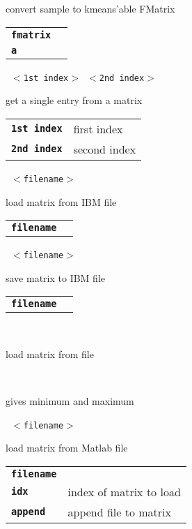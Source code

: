 \begin{description}
\begin{description}
        convert sample to kmeans'able FMatrix

      \begin{tabular}{ll}
 \texttt{\textbf{fmatrix}} &  \\
 \texttt{\textbf{a}} &          \\
      \end{tabular}
       \texttt{ $<$1st index$>$ $<$2nd index$>$} \

        get a single entry from a matrix

      \begin{tabular}{ll}
 \texttt{\textbf{1st index}} &  first index  \\
 \texttt{\textbf{2nd index}} &  second index  \\
      \end{tabular}
       \texttt{ $<$filename$>$} \

        load matrix from IBM file

      \begin{tabular}{ll}
 \texttt{\textbf{filename}} &    \\
      \end{tabular}
       \texttt{ $<$filename$>$} \

        save matrix to IBM file

      \begin{tabular}{ll}
 \texttt{\textbf{filename}} &    \\
      \end{tabular}
       \texttt{} \

        load matrix from file

       \texttt{} \

        gives minimum and maximum

       \texttt{ $<$filename$>$  } \

        load matrix from Matlab file

      \begin{tabular}{ll}
 \texttt{\textbf{filename}} &    \\
 \texttt{\textbf{idx}} &        index of matrix to load  \\
 \texttt{\textbf{append}} &     append file to matrix  \\
      \end{tabular}
       \texttt{   } \


\end{description}
\end{description}
